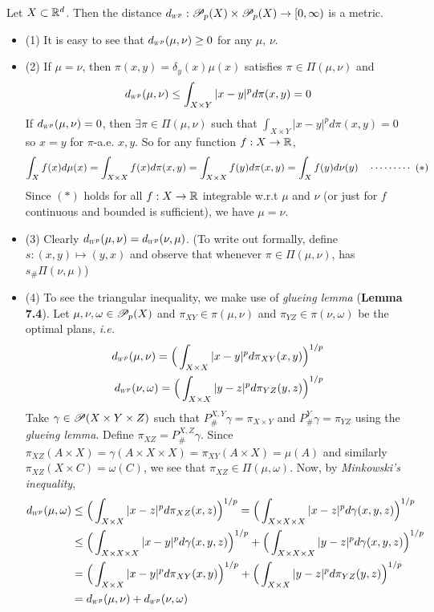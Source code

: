 \documentclass[12pt,a4paper]{article}
\newenvironment{proof}
{\begin{changemargin}{1cm}{0.5cm} 
	}%
	{\end{changemargin}
}
\renewenvironment{i}
{\begin{itemize} 
	}%
	{\end{itemize}
}
\newenvironment{p}
{\begin{proof} 
	}%
	{\end{proof}
}
\begin{document}
 Let $X\subset \mathbb{R}^d$. Then the distance $\wa{p} : \PP_p(X) \times \PP_p(X) \rightarrow [0, \infty)$ is a metric.
\begin{p}
\pf \begin{i}
\item[(1)] It is easy to see that $\wa{p}(\mu, \nu) \geq 0$ for any $\mu$, $\nu$.

\item[(2)] If $\mu = \nu$, then $\pi(x,y) = \delta_y(x) \mu(x)$ satisfies $\pi \in \Pi(\mu, \nu)$ and
\begin{align*}
\wa{p}(\mu, \nu) \leq \int_{X\times Y} |x-y|^p d\pi(x,y) = 0
\end{align*}
If $\wa{p}(\mu, \nu) =0$, then $\exists \pi \in \Pi(\mu, \nu)$ such that $\int_{X\times Y} |x-y|^p d\pi(x,y) =0$ so $x=y$ for $\pi$-a.e. $x,y$. So for any function $f:X\rightarrow \mathbb{R}$,
\begin{align*}
\int_X f(x) d\mu(x) = \int_{X\times X} f(x) d\pi(x,y) = \int_{X\times X} f(y) d\pi(x,y)  = \int_X f(y)d\nu(y) \quad \cdots\cdots\cdots\,\,(*)
\end{align*}
Since $(*)$ holds for all $f:X\rightarrow \mathbb{R}$ integrable w.r.t $\mu$ and $\nu$ (or just for $f$ continuous and bounded is sufficient), we have $\mu = \nu$.
\item[(3)] Clearly $\wa{p}(\mu, \nu)= \wa{p}(\nu,\mu)$. (To write out formally, define $s:(x,y) \mapsto (y,x)$ and observe that whenever $\pi \in \Pi(\mu, \nu)$, has $s_{\#} \Pi(\nu, \mu)$)
\item[(4)] To see the triangular inequality, we make use of \emph{glueing lemma} (\textbf{Lemma 7.4}). Let $\mu, \nu, \omega \in \mathscr{P}_p(X)$ and $\pi_{XY} \in \pi(\mu, \nu)$ and $\pi_{YZ} \in \pi(\nu, \omega)$ be the optimal plans, \textit{i.e.}
\begin{align*}
\wa{p}(\mu, \nu) = \Big( \int_{X\times X} |x-y|^p d\pi_{XY}(x,y) \Big)^{1/p} \\
\wa{p}(\nu, \omega) = \Big( \int_{X\times X} |y-z|^p d\pi_{YZ}(y,z) \Big)^{1/p}
\end{align*}
Take $\gamma \in \mathscr{P}(X\times Y\times Z)$ such that $P^{X,Y}_{\#} \gamma =\pi_{X\times Y}$ and $P^Y_{\#} \gamma =\pi_{YZ}$ using the \emph{glueing lemma}. Define $\pi_{XZ} = P^{X, Z}_{\#} \gamma$. Since $\pi_{XZ}(A\times X) = \gamma(A\times X \times X) = \pi_{XY}(A\times X) = \mu(A)$ and similarly $\pi_{XZ} (X\times C) = \omega(C)$, we see that $\pi_{XZ} \in \Pi(\mu, \omega)$. Now, by \emph{Minkowski's inequality},
\begin{align*}
\wa{p}(\mu, \omega) &\leq \Big( \int_{X\times X} |x-z|^p d\pi_{XZ}(x,z) \Big)^{1/p} = \Big( \int_{X\times X\times X} |x-z|^p d\gamma (x,y,z) \Big)^{1/p} \\
&\leq \Big( \int_{X\times X\times X} |x-y|^p d\gamma (x,y,z) \Big)^{1/p} + \Big( \int_{X\times X\times X} |y-z|^p d\gamma (x,y,z) \Big)^{1/p} \\
&= \Big( \int_{ X\times X} |x-y|^p d\pi_{XY} (x,y) \Big)^{1/p} + \Big( \int_{X\times X} |y-z|^p d\pi_{YZ} (y,z) \Big)^{1/p} \\
&=\wa{p}(\mu, \nu) + \wa{p}(\nu, \omega)
\end{align*}
\end{i}
\eop
\end{p}
\s
\end{document}
